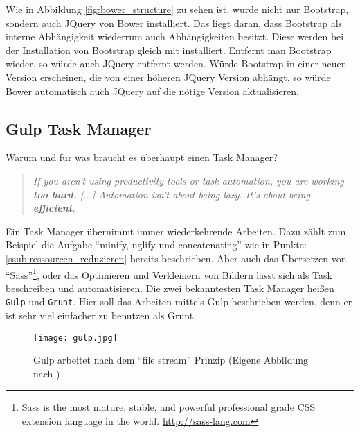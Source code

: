 			Wie in Abbildung \ref{fig:bower_structure} zu sehen ist, wurde nicht nur Bootstrap, sondern auch JQuery von Bower installiert. Das liegt daran, dass Bootstrap als interne Abhängigkeit wiederrum auch Abhängigkeiten besitzt. Diese werden bei der Installation von Bootstrap gleich mit installiert. Entfernt man Bootstrap wieder, so würde auch JQuery entfernt werden. Würde Bootstrap in einer neuen Version erscheinen, die von einer höheren JQuery Version abhängt, so würde Bower automatisch auch JQuery auf die nötige Version aktualisieren.
		

	\pagebreak

	\subsection{Gulp Task Manager} %
	\label{sub:gulp_task_manager}
		Warum und für was braucht es überhaupt einen Task Manager?
		\begin{quote}
			\textit{If you aren't using productivity tools or task automation, you are working \textbf{too hard.} [...] Automation isn't about being lazy. It's about being \textbf{efficient}.}\autocite[p. 18,78]{addyOsmani14}
		\end{quote}
		Ein Task Manager übernimmt immer wiederkehrende Arbeiten. Dazu zählt zum Beispiel die Aufgabe "`minify, uglify und concatenating"' wie in Punkte: \ref{ssub:ressourcen_reduzieren} bereits beschrieben. Aber auch das Übersetzen von "`Sass"'\footnote{Sass is the most mature, stable, and powerful professional grade CSS extension language in the world. \url{http://sass-lang.com}}, oder das Optimieren und Verkleinern von Bildern lässt sich als Task beschreiben und automatisieren.
		Die zwei bekanntesten Task Manager heißen \texttt{Gulp} und \texttt{Grunt}. Hier soll das Arbeiten mittels Gulp beschrieben werden, denn er ist sehr viel einfacher zu benutzen als Grunt.

		\begin{figure}[htbp]
			\begin{center}
				\texttt{[image: gulp.jpg]}
				\caption{Gulp arbeitet nach dem "`file stream"' Prinzip (Eigene Abbildung nach \autocite[p. 85]{addyOsmani14})}
				\label{fig:gulp}
			\end{center}
		\end{figure}

